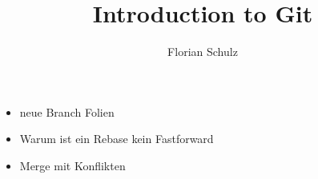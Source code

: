 \documentclass{beamer}
\title[Git]{Introduction to Git}
\author{Florian Schulz}
\begin{document}
\begin{frame}
\titlepage
\end{frame}

\begin{frame}
\begin{itemize}
  \item neue Branch Folien
  \item Warum ist ein Rebase kein Fastforward
  \item Merge mit Konflikten
\end{itemize}
\end{frame}



\end{document}
